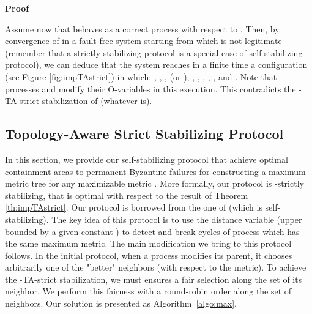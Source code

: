 \documentclass[11pt]{article}
\newenvironment{proof}{\noindent\textbf{Proof}}{\hfill\qed}
\newcommand{\qed}{\hfill}
\begin{document}
\begin{proof}
\begin{description}
\begin{description}
Assume now that  behaves as a correct process with respect to . Then, by convergence of  in a fault-free system starting from  which is not legitimate (remember that a strictly-stabilizing protocol is a special case of self-stabilizing protocol), we can deduce that the system reaches in a finite time a configuration  (see Figure \ref{fig:impTAstrict}) in which: , , ,  (or ), ,  , , , ,  and . Note that processes  and  modify their O-variables in this execution. This contradicts the -TA-strict stabilization of  (whatever  is).
\end{description}
\end{description}
\end{proof}

\subsection{Topology-Aware Strict Stabilizing Protocol}

In this section, we provide our self-stabilizing protocol that achieve optimal containment areas to permanent Byzantine failures for constructing a maximum metric tree for any maximizable metric . More formally, our protocol is -strictly stabilizing, that is optimal with respect to the result of Theorem \ref{th:impTAstrict}. Our protocol is borrowed from the one of \cite{GS99c} (which is self-stabilizing). The key idea of this protocol is to use the distance variable (upper bounded by a given constant ) to detect and break cycles of process which has the same maximum metric. The main modification we bring to this protocol follows. In the initial protocol, when a process modifies its parent, it chooses arbitrarily one of the "better" neighbors (with respect to the metric).  To achieve the -TA-strict stabilization, we must ensures a fair selection along the set of its neighbor. We perform this fairness with a round-robin order along the set of neighbors. Our solution is presented as Algorithm~\ref{algo:max}.
\end{document}
